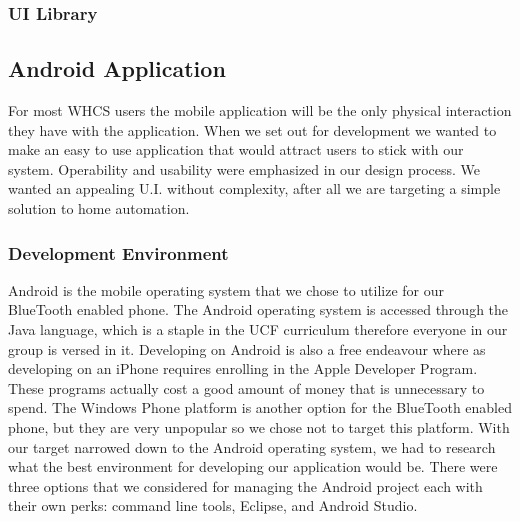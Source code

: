 \subsubsection{UI Library}
\label{sec:ui-lib}


\subsection{Android Application} For most WHCS users the mobile application
will be the only physical interaction they have with the application. When we
set out for development we wanted to make an easy to use application that would
attract users to stick with our system.  Operability and usability were
emphasized in our design process. We wanted an appealing U.I. without
complexity, after all we are targeting a simple solution to home automation.

\subsubsection{Development Environment} Android is the mobile operating system
that we chose to utilize for our BlueTooth enabled phone. The Android operating
system is accessed through the Java language, which is a staple in the UCF
curriculum therefore everyone in our group is versed in it. Developing on
Android is also a free endeavour where as developing on an iPhone requires
enrolling in the Apple Developer Program. These programs actually cost a good
amount of money that is unnecessary to spend. The Windows Phone platform is
another option for the BlueTooth enabled phone, but they are very unpopular so
we chose not to target this platform. With our target narrowed down to the
Android operating system, we had to research what the best environment for
developing our application would be. There were three options that we
considered for managing the Android project each with their own perks: command
line tools, Eclipse, and Android Studio.

